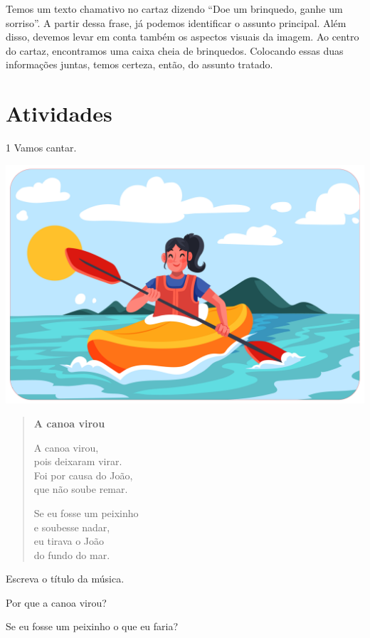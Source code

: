 {Temos um texto chamativo no cartaz dizendo ``Doe um brinquedo, ganhe um sorriso''. A partir dessa frase, já podemos identificar o assunto principal. Além disso, devemos levar em conta também os aspectos visuais da imagem. Ao centro do cartaz, encontramos uma caixa cheia de brinquedos. Colocando essas duas informações juntas, temos certeza, então, do assunto tratado.
}

\section*{Atividades}

\num{1} Vamos cantar.


\begin{myquote}
\begin{center}
\noindent\includegraphics[width=.6\textwidth]{media/image183.png}\bigskip
\end{center}
\begin{verse}
\textbf{A canoa virou}

A canoa virou,\\
pois deixaram virar.\\
Foi por causa do João,\\
que não soube remar.

Se eu fosse um peixinho\\
e soubesse nadar,\\
eu tirava o João\\
do fundo do mar.
\end{verse}

\end{myquote}

\begin{escolha}
\item Escreva o título da música.\\

\item Por que a canoa virou?\\

\item Se eu fosse um peixinho o que eu faria?\\
\end{escolha}

